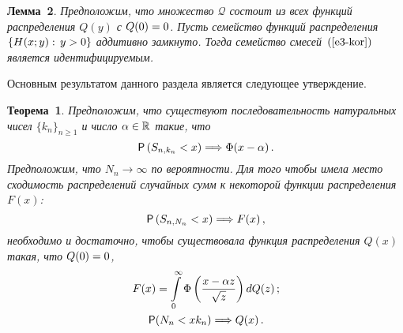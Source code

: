 \begin{multicols}{2}
\smallskip

\noindent
\textbf{Лемма~2}. \textit{Предположим, что множество $\mathcal{Q}$ состоит
из всех функций распределения $Q(y)$ с $Q(0)\hm=0$. Пусть семейство
функций распределения $\{H(x;y):\,y\hm>0\}$ ад\-ди\-тив\-но замкнуто.
Тогда семейство смесей~$(\ref{e3-kor})$ является идентифицируемым.}

\smallskip

Основным результатом данного раздела является следующее утверждение.

\smallskip

\noindent
\textbf{Теорема~1}. \textit{Предположим, что существуют последовательность
натуральных чисел $\{k_n\}_{n\geqslant1}$ и число $\alpha\hm\in\mathbb{R}$
такие, что}
\begin{equation}
{\sf P}\left(S_{n,k_n}<x\right)\Longrightarrow \Phi(x-\alpha)\,.\label{e5-kor}
\end{equation}
\textit{Предположим, что $N_n\to\infty$ по вероятности. Для того чтобы имела
место сходимость распределений случайных сумм к некоторой функции
распределения $F(x)$:}
\begin{equation*}
{\sf P}\left(S_{n,N_n}<x\right)\Longrightarrow F(x)\,,
\end{equation*}
\textit{необходимо и достаточно, чтобы существовала функция распределения
$Q(x)$ такая, что $Q(0)\hm=0$,}
\begin{gather}
F(x)=\int\limits_{0}^{\infty}\Phi\left(\displaystyle\frac{\displaystyle x-\alpha
z\mathstrut}{\displaystyle \sqrt{z}\mathstrut}\right)dQ(z)\,;\label{e7-kor}\\
{\sf P}(N_n<xk_n)\Longrightarrow Q(x)\,.
\label{e8-kor}
\end{gather}


\smallskip


\end{multicols}
